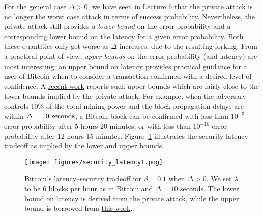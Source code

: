\documentclass{article}
\begin{document}
For the general case $\Delta > 0$, we have seen in Lecture 6 that the private attack is no longer the worst case attack in terms of success probability. Nevertheless, the private attack still provides a {\em lower bound} on the error probability and a corresponding lower bound on the latency for a given error probability. Both these quantities   only get worse as $\Delta$ increases, due to the resulting forking.  From a practical point of view, {\em upper bounds} on the error probability (and latency) are most interesting; an upper bound on latency provides practical guidance for a user of {\sf Bitcoin} when to consider a transaction confirmed with a desired level of confidence. A   \href{https://arxiv.org/pdf/2011.14051.pdf}{recent work} reports such upper bounds which are fairly close to the lower bounds implied by the private attack. For example, when the adversary controls 10\% of the total mining power and the block propagation delays are within $\Delta = 10 {\rm ~seconds}$, a Bitcoin block can be confirmed with less than $10^{-3}$ error probability after 5 hours 20 minutes, or with less than $10^{-10}$ error probability after 12 hours 15 minutes. Figure~\ref{fig:tradeoff1} illustrates the security-latency tradeoff as implied by the lower and upper bounds. 

\begin{figure}
\begin{center}
\texttt{[image: figures/security\_latency1.png]}
\end{center}
\caption{Bitcoin’s latency–security tradeoff for $\beta = 0.1$ when $\Delta >0$. We set $\lambda$ to be 6 blocks per hour as in Bitcoin and $\Delta = 10$ seconds. The lower bound on  latency is derived from the private attack, while the upper bound is borrowed from  \href{https://arxiv.org/pdf/2011.14051.pdf}{this work}.}
\label{fig:tradeoff1}

\end{figure}


\end{document}
